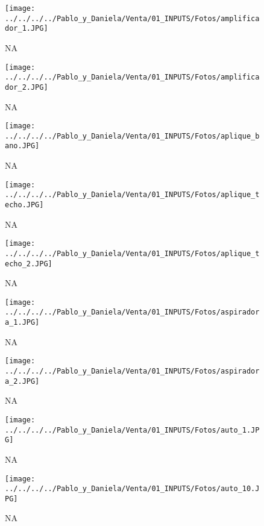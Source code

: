 \documentclass[
]{article}
\begin{document}
\pagebreak

\begin{figure}
\centering
\texttt{[image: ../../../../Pablo\_y\_Daniela/Venta/01\_INPUTS/Fotos/amplificador\_1.JPG]}
\caption{NA}
\end{figure}

\pagebreak

\begin{figure}
\centering
\texttt{[image: ../../../../Pablo\_y\_Daniela/Venta/01\_INPUTS/Fotos/amplificador\_2.JPG]}
\caption{NA}
\end{figure}

\pagebreak

\begin{figure}
\centering
\texttt{[image: ../../../../Pablo\_y\_Daniela/Venta/01\_INPUTS/Fotos/aplique\_bano.JPG]}
\caption{NA}
\end{figure}

\pagebreak

\begin{figure}
\centering
\texttt{[image: ../../../../Pablo\_y\_Daniela/Venta/01\_INPUTS/Fotos/aplique\_techo.JPG]}
\caption{NA}
\end{figure}

\pagebreak

\begin{figure}
\centering
\texttt{[image: ../../../../Pablo\_y\_Daniela/Venta/01\_INPUTS/Fotos/aplique\_techo\_2.JPG]}
\caption{NA}
\end{figure}

\pagebreak

\begin{figure}
\centering
\texttt{[image: ../../../../Pablo\_y\_Daniela/Venta/01\_INPUTS/Fotos/aspiradora\_1.JPG]}
\caption{NA}
\end{figure}

\pagebreak

\begin{figure}
\centering
\texttt{[image: ../../../../Pablo\_y\_Daniela/Venta/01\_INPUTS/Fotos/aspiradora\_2.JPG]}
\caption{NA}
\end{figure}

\pagebreak

\begin{figure}
\centering
\texttt{[image: ../../../../Pablo\_y\_Daniela/Venta/01\_INPUTS/Fotos/auto\_1.JPG]}
\caption{NA}
\end{figure}

\pagebreak

\begin{figure}
\centering
\texttt{[image: ../../../../Pablo\_y\_Daniela/Venta/01\_INPUTS/Fotos/auto\_10.JPG]}
\caption{NA}
\end{figure}
\end{document}
